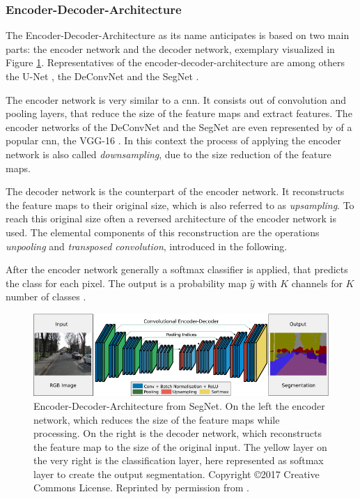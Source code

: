 \subsubsection{Encoder-Decoder-Architecture}
The Encoder-Decoder-Architecture as its name anticipates is based on two main parts: the encoder network and the decoder network, exemplary visualized in Figure \ref{fig:ch2:sec2:encoder-decoder}. 
Representatives of the encoder-decoder-architecture are among others the U-Net \cite{RF15-U-Net}, the DeConvNet \cite{NHH15-DeConvNet} and the SegNet \cite{Bad17-SegNet}.

The encoder network is very similar to a \gls{cnn}.
It consists out of convolution and pooling layers, that reduce the size of the feature maps and extract features.
The encoder networks of the DeConvNet \cite{NHH15-DeConvNet} and the SegNet \cite{Bad17-SegNet} are even represented by of a popular \gls{cnn}, the VGG-16 \cite{SZ15-VGG16}. 
In this context the process of applying the encoder network is also called \textit{downsampling}, due to the size reduction of the feature maps.

The decoder network is the counterpart of the encoder network.
It reconstructs the feature maps to their original size, which is also referred to as \textit{upsampling}.
To reach this original size often a reversed architecture of the encoder network is used.
The elemental components of this reconstruction are the operations \textit{unpooling} and \textit{transposed convolution}, introduced in the following.

After the encoder network generally a softmax classifier is applied, that predicts the class for each pixel.
The output is a probability map $\hat{y}$ with $K$ channels for $K$ number of classes \cite{Bad17-SegNet}.

\begin{figure}
	\includegraphics[width=\linewidth]{figures/chap223_segnet_arch.png}
	\caption[Encoder-Decoder-Architecture]{
		Encoder-Decoder-Architecture from SegNet. 
		On the left the encoder network, which reduces the size of the feature maps while processing. 
		On the right is the decoder network, which reconstructs the feature map to the size of the original input. 
		The yellow layer on the very right is the classification layer, here represented as softmax layer to create the output segmentation. 
		Copyright \copyright 2017 Creative Commons License. Reprinted by permission from \cite{Bad17-SegNet}.}
	\label{fig:ch2:sec2:encoder-decoder}
\end{figure}

